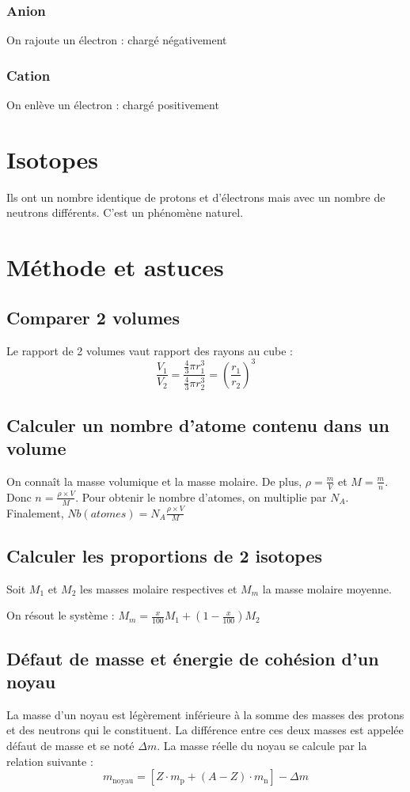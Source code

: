 \documentclass[french]{yLectureNote}
\begin{document}
\subsubsection{Anion}
On rajoute un électron : chargé négativement
\subsubsection{Cation}
On enlève un électron : chargé positivement
\section{Isotopes}
Ils ont un nombre identique de protons et d'électrons mais avec un nombre de neutrons différents. C'est un phénomène naturel.

\section{Méthode et astuces}
\subsection{Comparer 2 volumes}
Le rapport de 2 volumes vaut rapport des rayons au cube :
\[\frac{V_1}{V_2} = \frac{\frac{4}{3}\pi r_1^3}{\frac{4}{3}\pi r_2^3} = (\frac{r_1}{r_2})^3\]
\subsection{Calculer un nombre d'atome contenu dans un volume}
On connaît la masse volumique et la masse molaire. De plus, $\rho = \frac{m}{V}$ et $M = \frac{m}{n}$. Donc $n = \frac{\rho \times V}{M}$. Pour obtenir le nombre d'atomes, on multiplie par $N_A$. Finalement, $Nb(atomes) = N_A\frac{\rho \times V}{M}$
\subsection{Calculer les proportions de 2 isotopes}
Soit $M_1$ et $M_2$ les masses molaire respectives et $M_m$ la masse molaire moyenne.

On résout le système : $\displaystyle M_m = \frac{x}{100}M_1 + (1-\frac{x}{100})M_2$
\subsection{Défaut de masse et énergie de cohésion d'un noyau}
La masse d'un noyau est légèrement inférieure à la somme des masses des protons et des neutrons qui le constituent. La différence entre ces deux masses est appelée défaut de masse et se noté $\Delta m$. La masse réelle du noyau se calcule par la relation suivante : \[m_{\mathrm{noyau}} = [Z\cdot m_{\mathrm{p}} + (A - Z)\cdot m_{\mathrm{n}}] - \Delta m\]
\end{document}
